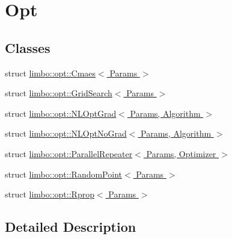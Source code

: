 \hypertarget{group__opt}{}\section{Opt}
\label{group__opt}
\subsection*{Classes}
\begin{DoxyCompactItemize}
\item 
struct \hyperlink{structlimbo_1_1opt_1_1_cmaes}{limbo\+::opt\+::\+Cmaes$<$ Params $>$}
\item 
struct \hyperlink{structlimbo_1_1opt_1_1_grid_search}{limbo\+::opt\+::\+Grid\+Search$<$ Params $>$}
\item 
struct \hyperlink{structlimbo_1_1opt_1_1_n_l_opt_grad}{limbo\+::opt\+::\+N\+L\+Opt\+Grad$<$ Params, Algorithm $>$}
\item 
struct \hyperlink{structlimbo_1_1opt_1_1_n_l_opt_no_grad}{limbo\+::opt\+::\+N\+L\+Opt\+No\+Grad$<$ Params, Algorithm $>$}
\item 
struct \hyperlink{structlimbo_1_1opt_1_1_parallel_repeater}{limbo\+::opt\+::\+Parallel\+Repeater$<$ Params, Optimizer $>$}
\item 
struct \hyperlink{structlimbo_1_1opt_1_1_random_point}{limbo\+::opt\+::\+Random\+Point$<$ Params $>$}
\item 
struct \hyperlink{structlimbo_1_1opt_1_1_rprop}{limbo\+::opt\+::\+Rprop$<$ Params $>$}
\end{DoxyCompactItemize}


\subsection{Detailed Description}
